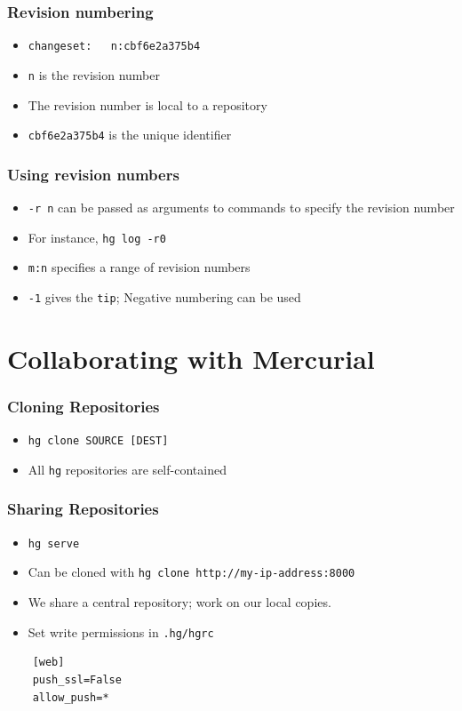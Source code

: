 \documentclass[14pt,compress]{beamer}
\newcommand{\typ}[1]{\lstinline{#1}}
\begin{document}
\begin{frame}[fragile]
  \frametitle{Revision numbering}
  \begin{itemize}
  \item \typ{changeset:   n:cbf6e2a375b4}
  \item \typ{n} is the revision number
  \item The revision number is local to a repository
  \item \typ{cbf6e2a375b4} is the unique identifier
  \end{itemize}
\end{frame}

\begin{frame}[fragile]
  \frametitle{Using revision numbers}
  \begin{itemize}
  \item \typ{-r n} can be passed as arguments to commands to specify
    the revision number
  \item For instance, \typ{hg log -r0} 
  \item \typ{m:n} specifies a range of revision numbers
  \item \typ{-1} gives the \typ{tip}; Negative numbering can be used
  \end{itemize}
\end{frame}

\section{Collaborating with Mercurial}
\begin{frame}[fragile]
  \frametitle{Cloning Repositories}
  \begin{itemize}
  \item \typ{hg clone SOURCE [DEST]}
  \item All \typ{hg} repositories are self-contained
  \end{itemize}
\end{frame}

\begin{frame}[fragile]
  \frametitle{Sharing Repositories}
  \begin{itemize}
  \item \typ{hg serve}
  \item Can be cloned with \typ{hg clone http://my-ip-address:8000}
  \item We share a central repository; work on our local copies. 
  \item Set write permissions in \typ{.hg/hgrc}
  \end{itemize}
  \begin{lstlisting}
    [web]
    push_ssl=False
    allow_push=*
  \end{lstlisting}
\end{frame}
\end{document}
